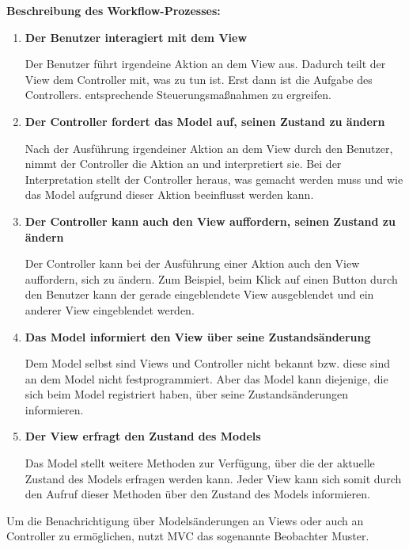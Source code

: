 \textbf{Beschreibung des Workflow-Prozesses:}
\begin{enumerate}
\item \textbf{Der Benutzer interagiert mit dem View}

Der Benutzer führt irgendeine Aktion an dem View aus. Dadurch teilt der View dem Controller mit, was zu tun ist. Erst dann ist die Aufgabe des Controllers. entsprechende Steuerungsmaßnahmen zu ergreifen.

\item  \textbf{Der Controller fordert das Model auf, seinen Zustand zu ändern}

Nach der Ausführung irgendeiner Aktion an dem View durch den Benutzer, nimmt der Controller die Aktion an und interpretiert sie. Bei der Interpretation stellt der Controller heraus, was gemacht werden muss und wie das Model aufgrund dieser Aktion beeinflusst werden kann.

\item  \textbf{Der Controller kann auch den View auffordern, seinen Zustand zu ändern}

Der Controller kann bei der Ausführung einer Aktion auch den View auffordern, sich zu ändern. Zum Beispiel, beim Klick auf einen Button durch den Benutzer kann der gerade eingeblendete View ausgeblendet und ein anderer View eingeblendet werden.

\item  \textbf{Das Model informiert den View über seine Zustandsänderung}

Dem Model selbst sind Views und Controller nicht bekannt bzw. diese sind an dem Model nicht festprogrammiert. Aber das Model kann diejenige, die sich beim Model registriert haben, über seine Zustandsänderungen informieren.

\item  \textbf{Der View erfragt den Zustand des Models}

Das Model stellt weitere Methoden zur Verfügung, über die der aktuelle Zustand des Models erfragen werden kann. 
Jeder View kann sich somit durch den Aufruf dieser Methoden über den Zustand des Models informieren.

\end{enumerate}
Um die Benachrichtigung über Modelsänderungen an Views oder auch an Controller zu ermöglichen, nutzt MVC das sogenannte Beobachter Muster.

